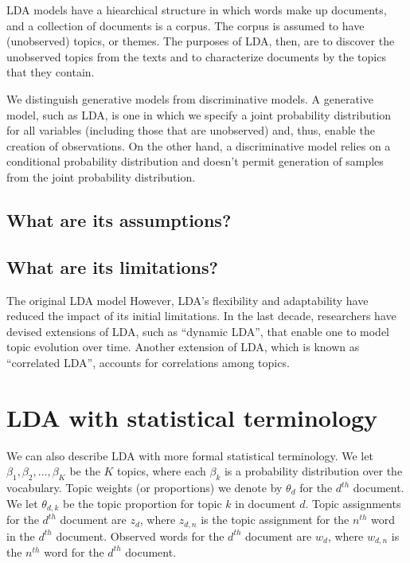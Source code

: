 \documentclass[12pt,]{article}
\begin{document}
LDA models have a hiearchical structure in which words make up
documents, and a collection of documents is a corpus. The corpus is
assumed to have (unobserved) topics, or themes. The purposes of LDA,
then, are to discover the unobserved topics from the texts and to
characterize documents by the topics that they contain.

We distinguish generative models from discriminative models. A
generative model, such as LDA, is one in which we specify a joint
probability distribution for all variables (including those that are
unobserved) and, thus, enable the creation of observations. On the other
hand, a discriminative model relies on a conditional probability
distribution and doesn't permit generation of samples from the joint
probability distribution.

\subsection{What are its assumptions?}\label{what-are-its-assumptions}

\subsection{What are its limitations?}\label{what-are-its-limitations}

The original LDA model However, LDA's flexibility and adaptability have
reduced the impact of its initial limitations. In the last decade,
researchers have devised extensions of LDA, such as ``dynamic LDA'',
that enable one to model topic evolution over time. Another extension of
LDA, which is known as ``correlated LDA'', accounts for correlations
among topics.

\section{LDA with statistical
terminology}\label{lda-with-statistical-terminology}

We can also describe LDA with more formal statistical terminology. We
let \(\beta_1, \beta_2, ..., \beta_K\) be the \(K\) topics, where each
\(\beta_k\) is a probability distribution over the vocabulary. Topic
weights (or proportions) we denote by \(\theta_d\) for the \(d^{th}\)
document. We let \(\theta_{d,k}\) be the topic proportion for topic
\(k\) in document \(d\). Topic assignments for the \(d^{th}\) document
are \(z_d\), where \(z_{d,n}\) is the topic assignment for the
\(n^{th}\) word in the \(d^{th}\) document. Observed words for the
\(d^{th}\) document are \(w_d\), where \(w_{d, n}\) is the \(n^{th}\)
word for the \(d^{th}\) document.
\end{document}
